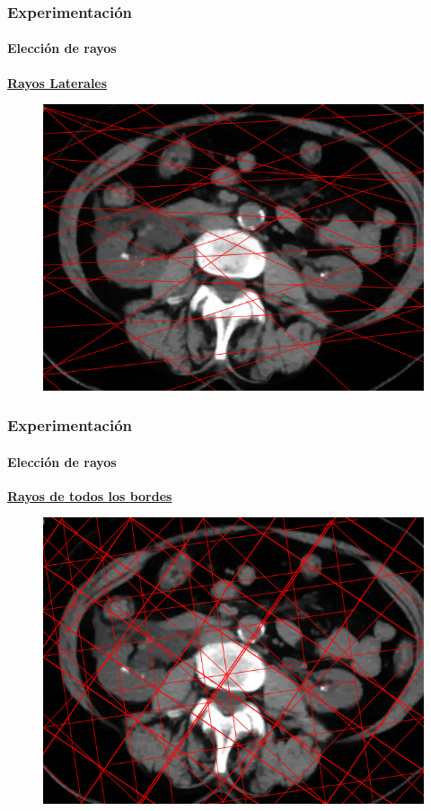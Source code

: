 \documentclass{beamer}
\begin{document}

\begin{frame}
  \frametitle{Experimentación}
  \framesubtitle{Elección de rayos}
  \textbf{\underline{Rayos Laterales}}
    \begin{figure}
      \centering
      \includegraphics[height=0.75\textheight]{imagenes/lateral.png}
    \end{figure}
\end{frame}


\begin{frame}
  \frametitle{Experimentación}
  \framesubtitle{Elección de rayos}
  \textbf{\underline{Rayos de todos los bordes}}
    \begin{figure}
      \centering
      \includegraphics[height=0.75\textheight]{imagenes/allborders.png}
    \end{figure}
\end{frame}
\end{document}
